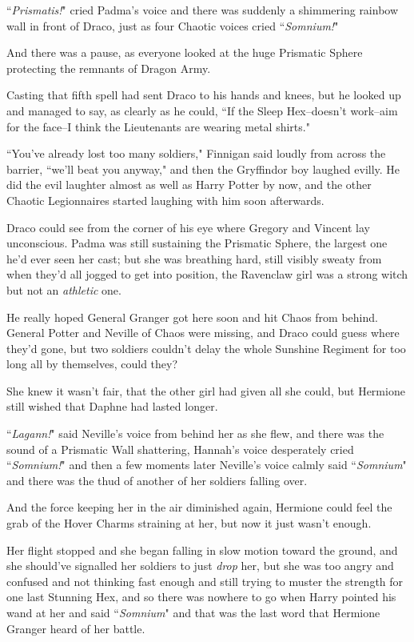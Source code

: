``\emph{Prismatis!}" cried Padma's voice and there was suddenly a shimmering rainbow wall in front of Draco, just as four Chaotic voices cried ``\emph{Somnium!}"

And there was a pause, as everyone looked at the huge Prismatic Sphere protecting the remnants of Dragon Army.

Casting that fifth spell had sent Draco to his hands and knees, but he looked up and managed to say, as clearly as he could, ``If the Sleep Hex\---doesn't work\---aim for the face\---I think the Lieutenants are wearing metal shirts."

``You've already lost too many soldiers," Finnigan said loudly from across the barrier, ``we'll beat you anyway," and then the Gryffindor boy laughed evilly. He did the evil laughter almost as well as Harry Potter by now, and the other Chaotic Legionnaires started laughing with him soon afterwards.

Draco could see from the corner of his eye where Gregory and Vincent lay unconscious. Padma was still sustaining the Prismatic Sphere, the largest one he'd ever seen her cast; but she was breathing hard, still visibly sweaty from when they'd all jogged to get into position, the Ravenclaw girl was a strong witch but not an \emph{athletic} one.

He really hoped General Granger got here soon and hit Chaos from behind. General Potter and Neville of Chaos were missing, and Draco could guess where they'd gone, but two soldiers couldn't delay the whole Sunshine Regiment for too long all by themselves, could they?

\later

She knew it wasn't fair, that the other girl had given all she could, but Hermione still wished that Daphne had lasted longer.

``\emph{Lagann!}" said Neville's voice from behind her as she flew, and there was the sound of a Prismatic Wall shattering, Hannah's voice desperately cried ``\emph{Somnium!}" and then a few moments later Neville's voice calmly said ``\emph{Somnium}" and there was the thud of another of her soldiers falling over.

And the force keeping her in the air diminished again, Hermione could feel the grab of the Hover Charms straining at her, but now it just wasn't enough.

Her flight stopped and she began falling in slow motion toward the ground, and she should've signalled her soldiers to just \emph{drop} her, but she was too angry and confused and not thinking fast enough and still trying to muster the strength for one last Stunning Hex, and so there was nowhere to go when Harry pointed his wand at her and said ``\emph{Somnium}" and that was the last word that Hermione Granger heard of her battle.

